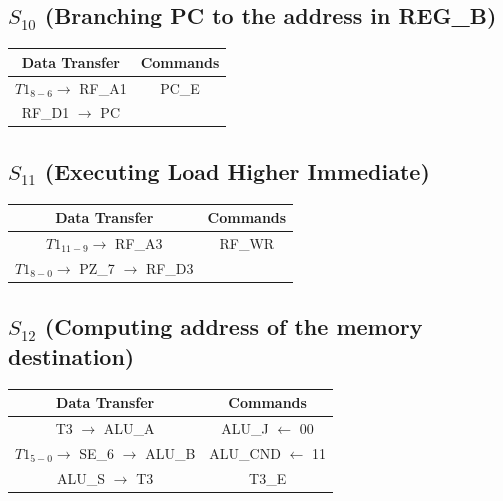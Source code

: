 \documentclass[]{report}
\begin{document}
        \subsection*{$S_{10}$ (Branching PC to the address in REG\_B)} %
        \begin{center}
            \begin{tabular}{|c|c|}
                \hline
                Data Transfer & Commands \\
                \hline
                $T1_{8-6} \to$ RF\_A1 & PC\_E\\
                RF\_D1 $\to$ PC & \\
                \hline
            \end{tabular}
        \end{center}
        \subsection*{$S_{11}$ (Executing Load Higher Immediate)} %
        \begin{center}
            \begin{tabular}{|c|c|}
                \hline
                Data Transfer & Commands \\
                \hline
                $T1_{11-9} \to$ RF\_A3 & RF\_WR\\
                $T1_{8-0} \to$ PZ\_7 $\to$ RF\_D3 & \\   %
                \hline
            \end{tabular}
        \end{center}

        \subsection*{$S_{12}$ (Computing address of the memory destination)} %
        \begin{center}
            \begin{tabular}{|c|c|}
                \hline
                Data Transfer & Commands \\
                \hline
                T3 $\to$ ALU\_A & ALU\_J $\leftarrow$ 00\\
                $T1_{5-0} \to$ SE\_6 $\to$ ALU\_B & ALU\_CND $\leftarrow$ 11\\
                ALU\_S $\to$ T3 & T3\_E\\
                \hline
            \end{tabular}
        \end{center}
\end{document}
